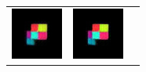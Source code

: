 \begin{figure}[tbp]
\begin{center}
\begin{tabular}{ccc}
\begin{minipage}{0.33\linewidth}
\begin{center}
          \includegraphics[width=\linewidth]{./figures/proposal_pred_1.png}
        \end{center}
      \end{minipage} &
      \begin{minipage}{0.33\linewidth}
        \begin{center}
          \includegraphics[width=\linewidth]{./figures/proposal_pred_2.png}

\end{center}
\end{minipage}
\end{tabular}
\end{center}
\end{figure}
